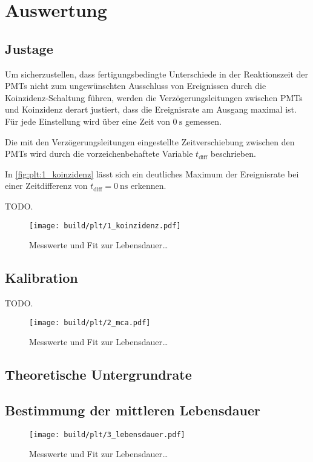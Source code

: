 \section{Auswertung}
\label{sec:auswertung}

\subsection{Justage}
Um sicherzustellen,
dass fertigungsbedingte Unterschiede in der Reaktionszeit der \acp{PMT}
nicht zum ungewünschten Ausschluss von Ereignissen durch die Koinzidenz-Schaltung führen,
werden die Verzögerungsleitungen zwischen \acp{PMT} und Koinzidenz derart justiert,
dass die Ereignisrate am Ausgang maximal ist.
Für jede Einstellung wird über eine Zeit von $\SI{0}{\second}$ gemessen.

Die mit den Verzögerungsleitungen eingestellte Zeitverschiebung zwischen den \acp{PMT}
wird durch die vorzeichenbehaftete Variable $t_\text{diff}$ beschrieben.

In \autoref{fig:plt:1_koinzidenz} lässt sich ein deutliches Maximum der Ereignisrate
bei einer Zeitdifferenz von $t_\text{diff} = \SI{0}{\nano\second}$ erkennen.

\begin{table}
    \centering
    \caption{TODO.}
    \label{tab:1_koinzidenz}
\end{table}

\begin{figure}
    \centering
    \texttt{[image: build/plt/1\_koinzidenz.pdf]}
    \caption{Messwerte und Fit zur Lebensdauer…}
    \label{fig:plt:1_koinzidenz}
\end{figure}

\subsection{Kalibration}
\begin{table}
    \centering
    \caption{TODO.}
    \label{tab:2_mca}
\end{table}

\begin{figure}
    \centering
    \texttt{[image: build/plt/2\_mca.pdf]}
    \caption{Messwerte und Fit zur Lebensdauer…}
    \label{fig:plt:2_mca}
\end{figure}


\subsection{Theoretische Untergrundrate}


\subsection{Bestimmung der mittleren Lebensdauer}
\begin{figure}
    \centering
    \texttt{[image: build/plt/3\_lebensdauer.pdf]}
    \caption{Messwerte und Fit zur Lebensdauer…}
    \label{fig:plt:3_lebensdauer}
\end{figure}
